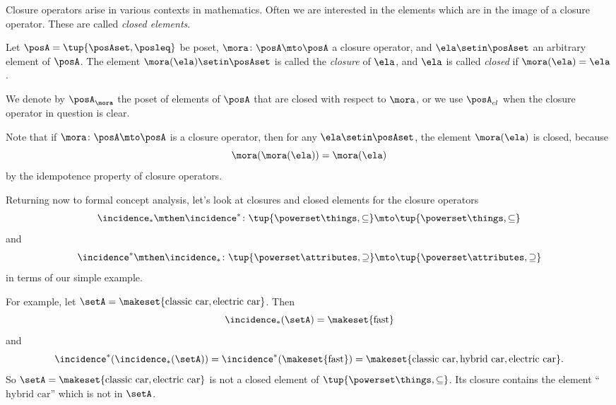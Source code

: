 Closure operators arise in various contexts in mathematics. Often we are interested in the elements which are in the image of a closure operator. These are called \emph{closed elements}. 

\begin{definition}\label{def:closure-closed-elements}
Let $\posA = \tup{\posAset, \posleq}$ be poset, $\mora \colon \posA \mto \posA$ a closure operator, and $\ela \setin \posAset$ an arbitrary element of $\posA$. The element $\mora(\ela) \setin \posAset$ is called the \emph{closure} of $\ela$, and $\ela$ is called \emph{closed} if $\mora(\ela) = \ela$. 

We denote by $\posA_\mora$ the poset of elements of $\posA$ that are closed with respect to $\mora$, or we use $\posA_{cl}$ when the closure operator in question is clear. 
\end{definition}

\begin{remark}\label{rem:closed-elements-are-image}
Note that if $\mora \colon \posA \mto \posA$ is a closure operator, then for any $\ela \setin \posAset$, the element $\mora(\ela)$ is closed, because
\begin{equation}
\mora(\mora(\ela)) = \mora(\ela)
\end{equation}
by the idempotence property of closure operators. 
\end{remark}


Returning now to formal concept analysis, let's look at closures and closed elements for the closure operators 
$$\incidence_* \mthen \incidence^* \colon \tup{\powerset \things, \subseteq} \mto \tup{\powerset \things, \subseteq}$$  
and 
$$\incidence^* \mthen \incidence_* \colon \tup{\powerset \attributes, \supseteq} \mto \tup{\powerset \attributes, \supseteq} $$ 
in terms of our simple example. 

For example, let $\setA = \makeset{\text{classic car}, \text{electric car}}$. Then 
\begin{equation}
\incidence_*(\setA) = \makeset{\text{fast}}
\end{equation}
and 
\begin{equation}
\incidence^*(\incidence_*(\setA)) = \incidence^*(\makeset{\text{fast}}) = \makeset{\text{classic car}, \text{hybrid car}, \text{electric car}}.
\end{equation}
So $\setA = \makeset{\text{classic car}, \text{electric car}}$ is not a closed element of $\tup{\powerset \things, \subseteq}$. Its closure contains the element ``$\text{hybrid car}$'' which is not in $\setA$.

